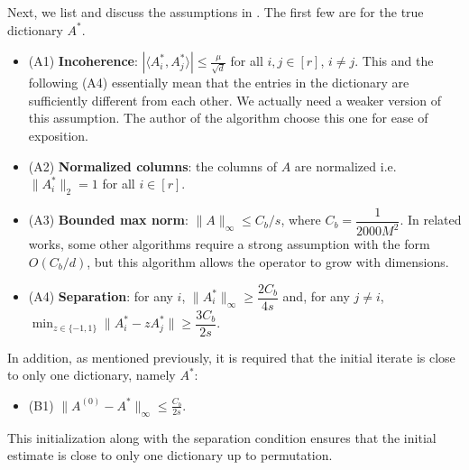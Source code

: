 Next, we list and discuss the assumptions in \cite{chatterji2017alternating}. The first few are for the true dictionary $A^*$. 
\begin{itemize}
    \item (A1) \textbf{Incoherence}: $\left| \langle A_i^*, A_j^*\rangle \right| \leq \frac{\mu}{\sqrt{d}} $ for all $i,j\in [r]$, $i\neq j$.  This and the following (A4) essentially mean that the entries in the dictionary are sufficiently different from each other. We actually need a weaker version of this assumption. The author of the algorithm choose this one for ease of exposition.
    \item (A2) \textbf{Normalized columns}: the columns of $A$ are normalized i.e. $\|A_i^*\|_2=1$ for all $i\in [r]$. 
    \item (A3) \textbf{Bounded max norm}: $\|A\|_\infty \leq C_b/s$, where $C_b = \dfrac{1}{2000 M^2}$. In related works, some other algorithms require a strong assumption with the form $O(C_b/d)$, but this algorithm allows the operator to grow with dimensions.
    \item (A4) \textbf{Separation}: for any $i$, $\|A_i^*\|_\infty \geq \dfrac{2C_b}{4s}$ 
    and, for any $j\neq i$, $\min_{z\in \{-1, 1\}} \|A_i^* - z A^*_j\|\geq \dfrac{3C_b}{2s}$.
\end{itemize}

In addition, as mentioned previously, it is required that the initial iterate is close to only one dictionary, namely $A^*$:
\begin{itemize}
    \item (B1) $\|A^{(0)} - A^*\|_\infty \leq \frac{C_b}{2s}$. 
\end{itemize}

This initialization along with the separation condition ensures that the initial estimate is close to only one dictionary up to permutation.


